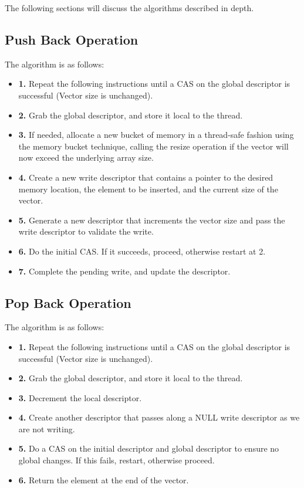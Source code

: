 \documentclass{article}
\begin{document}
The following sections will discuss the algorithms described in depth.

\subsection*{Push Back Operation}
The algorithm is as follows:
\begin{itemize}
    \item \textbf{1.} Repeat the following instructions until a CAS on the global descriptor is successful (Vector size is unchanged).
    \item \textbf{2.} Grab the global descriptor, and store it local to the thread.
    \item \textbf{3.} If needed, allocate a new bucket of memory in a thread-safe fashion using the memory bucket technique, calling the resize operation if the vector will now exceed the underlying array size.
    \item \textbf{4.} Create a new write descriptor that contains a pointer to the desired memory location, the element to be inserted, and the current size of the vector.
    \item \textbf{5.} Generate a new descriptor that increments the vector size and pass the write descriptor to validate the write.
    \item \textbf{6.} Do the initial CAS. If it succeeds, proceed, otherwise restart at 2.
    \item \textbf{7.} Complete the pending write, and update the descriptor.
\end{itemize}

\subsection*{Pop Back Operation}
The algorithm is as follows:
\begin{itemize}
    \item \textbf{1.} Repeat the following instructions until a CAS on the global descriptor is successful (Vector size is unchanged).
    \item \textbf{2.} Grab the global descriptor, and store it local to the thread.
    \item \textbf{3.} Decrement the local descriptor.
    \item \textbf{4.} Create another descriptor that passes along a NULL write descriptor as we are not writing.
    \item \textbf{5.} Do a CAS on the initial descriptor and global descriptor to ensure no global changes. If this fails, restart, otherwise proceed.
    \item \textbf{6.} Return the element at the end of the vector.
\end{itemize}
\end{document}
